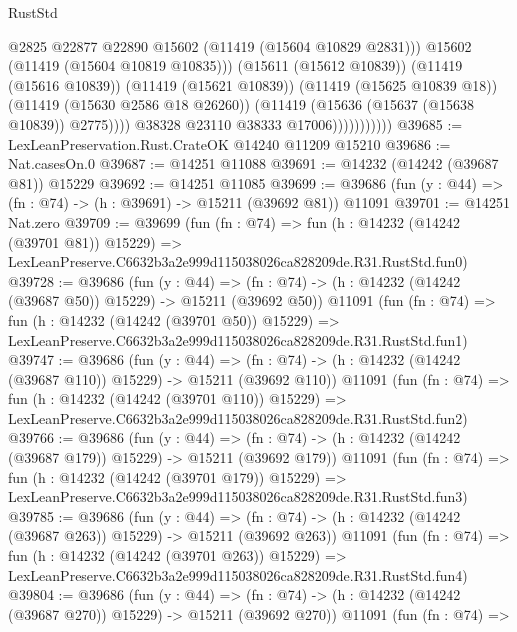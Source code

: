 \begin{lexlean}{RustStd}
\begin{coremodule}
                                  @2825
                                  @22877
                                  @22890
                                  @15602
                                  (@11419 (@15604 @10829 @2831)))
                                @15602
                                (@11419 (@15604 @10819 @10835)))
                              (@15611 (@15612 @10839))
                              (@11419 (@15616 @10839))
                              (@11419 (@15621 @10839))
                              (@11419 (@15625 @10839 @18))
                              (@11419 (@15630 @2586 @18 @26260))
                              (@11419 (@15636 (@15637 (@15638 @10839)) @2775))))
                          @38328
                          @23110
                          @38333
                          @17006)))))))))))
@39685 := LexLeanPreservation.Rust.CrateOK @14240 @11209 @15210
@39686 := Nat.casesOn.{0}
@39687 := @14251 @11088
@39691 := @14232 (@14242 (@39687 @81)) @15229
@39692 := @14251 @11085
@39699 := @39686 (fun (y : @44) => (fn : @74) -> (h : @39691) -> @15211 (@39692 @81)) @11091
@39701 := @14251 Nat.zero
@39709 := @39699
    (fun (fn : @74) =>
    fun (h : @14232 (@14242 (@39701 @81)) @15229) =>
    LexLeanPreserve.C6632b3a2e999d115038026ca828209de.R31.RustStd.fun0)
@39728 := @39686
    (fun (y : @44) =>
    (fn : @74) -> (h : @14232 (@14242 (@39687 @50)) @15229) -> @15211 (@39692 @50))
    @11091
    (fun (fn : @74) =>
    fun (h : @14232 (@14242 (@39701 @50)) @15229) =>
    LexLeanPreserve.C6632b3a2e999d115038026ca828209de.R31.RustStd.fun1)
@39747 := @39686
    (fun (y : @44) =>
    (fn : @74) -> (h : @14232 (@14242 (@39687 @110)) @15229) -> @15211 (@39692 @110))
    @11091
    (fun (fn : @74) =>
    fun (h : @14232 (@14242 (@39701 @110)) @15229) =>
    LexLeanPreserve.C6632b3a2e999d115038026ca828209de.R31.RustStd.fun2)
@39766 := @39686
    (fun (y : @44) =>
    (fn : @74) -> (h : @14232 (@14242 (@39687 @179)) @15229) -> @15211 (@39692 @179))
    @11091
    (fun (fn : @74) =>
    fun (h : @14232 (@14242 (@39701 @179)) @15229) =>
    LexLeanPreserve.C6632b3a2e999d115038026ca828209de.R31.RustStd.fun3)
@39785 := @39686
    (fun (y : @44) =>
    (fn : @74) -> (h : @14232 (@14242 (@39687 @263)) @15229) -> @15211 (@39692 @263))
    @11091
    (fun (fn : @74) =>
    fun (h : @14232 (@14242 (@39701 @263)) @15229) =>
    LexLeanPreserve.C6632b3a2e999d115038026ca828209de.R31.RustStd.fun4)
@39804 := @39686
    (fun (y : @44) =>
    (fn : @74) -> (h : @14232 (@14242 (@39687 @270)) @15229) -> @15211 (@39692 @270))
    @11091
    (fun (fn : @74) =>

\end{coremodule}
\end{lexlean}
